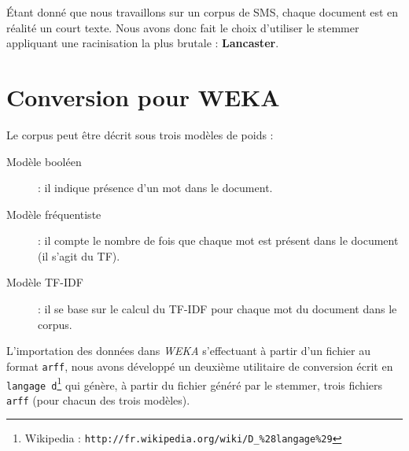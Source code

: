 Étant donné que nous travaillons sur un corpus de SMS, chaque document est en réalité un court texte. Nous avons donc fait le choix d'utiliser le stemmer appliquant une racinisation la plus brutale : \textbf{Lancaster}.

\section{Conversion pour WEKA}
Le corpus peut être décrit sous trois modèles de poids :

\begin{description}
\item[Modèle booléen] : il indique présence d'un mot dans le document.
\item[Modèle fréquentiste] : il compte le nombre de fois que chaque mot est présent dans le document (il s'agit du TF).
\item[Modèle TF-IDF] : il se base sur le calcul du TF-IDF pour chaque mot du document dans le corpus.
\end{description}

L'importation des données dans \textit{WEKA} s'effectuant à partir d'un fichier au format \texttt{arff}, nous avons développé un deuxième utilitaire de conversion écrit en \texttt{langage d}\footnote{Wikipedia : \texttt{http://fr.wikipedia.org/wiki/D\_\%28langage\%29}} qui génère, à partir du fichier généré par le stemmer, trois fichiers \texttt{arff} (pour chacun des trois modèles).